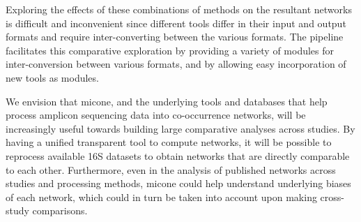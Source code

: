 
Exploring the effects of these combinations of methods on the resultant networks is difficult and inconvenient since different tools differ in their input and output formats and require inter-converting between the various formats.
The pipeline facilitates this comparative exploration by providing a variety of modules for inter-conversion between various formats, and by allowing easy incorporation of new tools as modules.

We envision that \ac{micone}, and the underlying tools and databases that help process amplicon sequencing data into co-occurrence networks, will be increasingly useful towards building large comparative analyses across studies. By having a unified transparent tool to compute networks, it will be possible to reprocess available 16S datasets to obtain networks that are directly comparable to each other. Furthermore, even in the analysis of published networks across studies and processing methods, \ac{micone} could help understand underlying biases of each network, which could in turn be taken into account upon making cross-study comparisons.  

